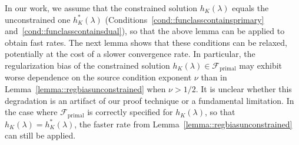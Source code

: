 \documentclass[11pt]{article}
\theoremstyle{plain}
\theoremstyle{definition}
\theoremstyle{remark}
\theoremstyle{definition}
\begin{document}
In our work, we assume that the constrained solution \( h_K(\lambda) \) equals the unconstrained one \( h_K^*(\lambda) \) (Conditions~\ref{cond::funclasscontainsprimary} and~\ref{cond::funclasscontainsdual}), so that the above lemma can be applied to obtain fast rates. The next lemma shows that these conditions can be relaxed, potentially at the cost of a slower convergence rate. In particular, the regularization bias of the constrained solution \( h_K(\lambda) \in \mathcal{F}_{\mathrm{primal}} \) may exhibit worse dependence on the source condition exponent \( \nu \) than in Lemma~\ref{lemma::regbiasunconstrained} when \( \nu > 1/2 \). It is unclear whether this degradation is an artifact of our proof technique or a fundamental limitation. In the case where \( \mathcal{F}_{\mathrm{primal}} \) is correctly specified for \( h_K(\lambda) \), so that \( h_K(\lambda) = h_K^*(\lambda) \), the faster rate from Lemma~\ref{lemma::regbiasunconstrained} can still be applied.




 
\end{document}
